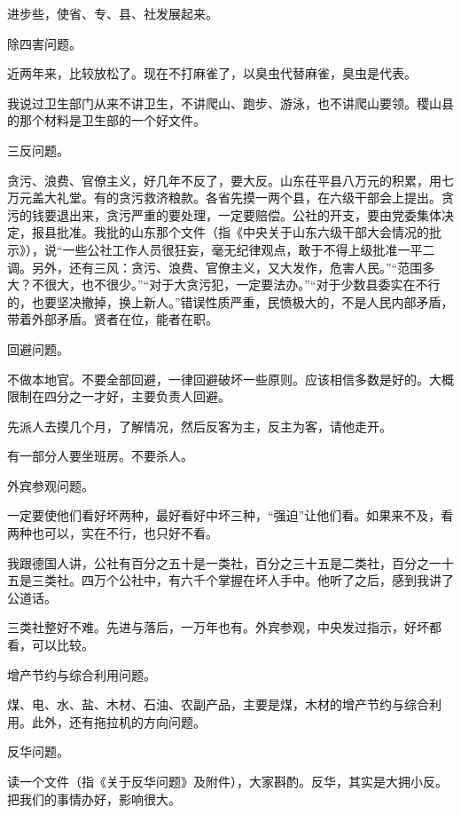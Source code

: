 进步些，使省、专、县、社发展起来。

除四害问题。

近两年来，比较放松了。现在不打麻雀了，以臭虫代替麻雀，臭虫是代表。

我说过卫生部门从来不讲卫生，不讲爬山、跑步、游泳，也不讲爬山要领。稷山县的那个材料是卫生部的一个好文件。

三反问题。

贪污、浪费、官僚主义，好几年不反了，要大反。山东茌平县八万元的积累，用七万元盖大礼堂。有的贪污救济粮款。各省先摸一两个县，在六级干部会上提出。贪污的钱要退出来，贪污严重的要处理，一定要赔偿。公社的开支，要由党委集体决定，报县批准。我批的山东那个文件（指《中央关于山东六级干部大会情况的批示》），说“一些公社工作人员很狂妄，毫无纪律观点，敢于不得上级批准一平二调。另外，还有三风：贪污、浪费、官僚主义，又大发作，危害人民。”“范围多大？不很大，也不很少。”“对于大贪污犯，一定要法办。”“对于少数县委实在不行的，也要坚决撤掉，换上新人。”错误性质严重，民愤极大的，不是人民内部矛盾，带着外部矛盾。贤者在位，能者在职。

回避问题。

不做本地官。不要全部回避，一律回避破坏一些原则。应该相信多数是好的。大概限制在四分之一才好，主要负责人回避。

先派人去摸几个月，了解情况，然后反客为主，反主为客，请他走开。

有一部分人要坐班房。不要杀人。

外宾参观问题。

一定要使他们看好坏两种，最好看好中坏三种，“强迫”让他们看。如果来不及，看两种也可以，实在不行，也只好不看。

我跟德国人讲，公社有百分之五十是一类社，百分之三十五是二类社，百分之一十五是三类社。四万个公社中，有六千个掌握在坏人手中。他听了之后，感到我讲了公道话。

三类社整好不难。先进与落后，一万年也有。外宾参观，中央发过指示，好坏都看，可以比较。

增产节约与综合利用问题。

煤、电、水、盐、木材、石油、农副产品，主要是煤，木材的增产节约与综合利用。此外，还有拖拉机的方向问题。

反华问题。

读一个文件（指《关于反华问题》及附件），大家斟酌。反华，其实是大拥小反。把我们的事情办好，影响很大。


